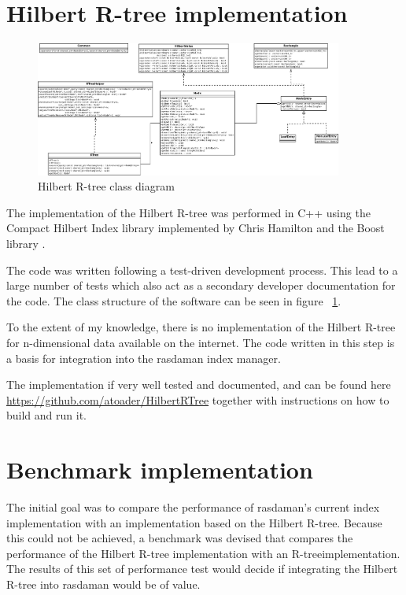 \documentclass[11pt, a4paper, oneside]{article}
\newcommand{\rtree}{R-tree}
\begin{document}
\section{Hilbert R-tree implementation}
\label{sec:hrtree}

\begin{figure}
  \centering
    \includegraphics[width=0.9\textwidth]{img/ClassDiagram.png}
      \caption{Hilbert R-tree class diagram}
  \label{fig:class_diagram}
\end{figure}


The implementation of the Hilbert R-tree was performed in C++ using the Compact Hilbert Index library\cite{libhilbert} implemented by Chris Hamilton and the Boost library \cite{boost}.

The code was written following a test-driven development process. This lead to a large number of tests which also act as a secondary developer documentation for the code.
The class structure of the software can be seen in figure ~\ref{fig:class_diagram}.

To the extent of my knowledge, there is no implementation of the Hilbert R-tree for n-dimensional data available on the internet. The code written in this step is a basis for integration into the rasdaman index manager.

The implementation if very well tested and documented, and can be found here \url{https://github.com/atoader/HilbertRTree} together with instructions on how to build and run it.
\section{Benchmark implementation}
\label{sec:benchmark}
The initial goal was to compare the performance of rasdaman's current index implementation with an implementation based on the Hilbert R-tree. Because this could not be achieved, a benchmark was devised that compares the performance of the Hilbert R-tree implementation with an \rtree  implementation. The results of this set of performance test would decide if integrating the Hilbert R-tree into rasdaman would be of value.
\end{document}
